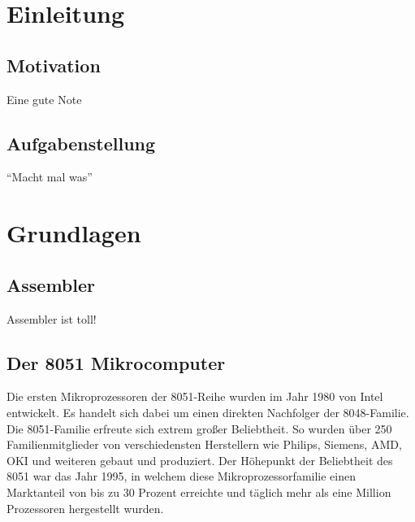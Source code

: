 


\newcommand{\autor}{Heidinger, Matthis, Riesinger, Stephan}
\newcommand{\kurs}{TINF17B1}
\newcommand{\titel}{4-Gewinnt auf einem Mikrocomputer der 8051-Famile}



\tableofcontents 

\chapter{Einleitung}

\section{Motivation}

Eine gute Note

\section{Aufgabenstellung}

\enquote{Macht mal was}

\chapter{Grundlagen}

\section{Assembler}

Assembler ist toll!

\section{Der 8051 Mikrocomputer}

Die ersten Mikroprozessoren der 8051-Reihe wurden im Jahr 1980 von Intel entwickelt. Es handelt sich dabei um einen direkten Nachfolger der 8048-Familie.
Die 8051-Familie erfreute sich extrem großer Beliebtheit. So wurden über 250 Familienmitglieder von verschiedensten Herstellern wie Philips, Siemens, AMD, OKI und weiteren gebaut und produziert. Der Höhepunkt der Beliebtheit des 8051 war das Jahr 1995, in welchem diese Mikroprozessorfamilie einen Marktanteil von bis zu 30 Prozent erreichte und täglich mehr als eine Million Prozessoren hergestellt wurden. 

